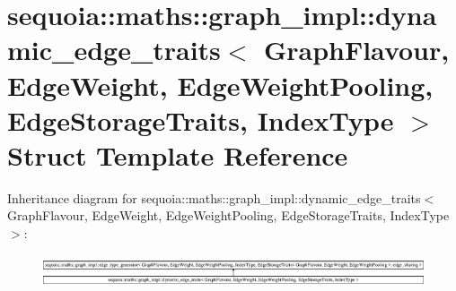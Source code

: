 \hypertarget{structsequoia_1_1maths_1_1graph__impl_1_1dynamic__edge__traits}{}\section{sequoia\+::maths\+::graph\+\_\+impl\+::dynamic\+\_\+edge\+\_\+traits$<$ Graph\+Flavour, Edge\+Weight, Edge\+Weight\+Pooling, Edge\+Storage\+Traits, Index\+Type $>$ Struct Template Reference}
\label{structsequoia_1_1maths_1_1graph__impl_1_1dynamic__edge__traits}
Inheritance diagram for sequoia\+::maths\+::graph\+\_\+impl\+::dynamic\+\_\+edge\+\_\+traits$<$ Graph\+Flavour, Edge\+Weight, Edge\+Weight\+Pooling, Edge\+Storage\+Traits, Index\+Type $>$\+:\begin{figure}[H]
\begin{center}
\leavevmode
\includegraphics[height=0.971379cm]{structsequoia_1_1maths_1_1graph__impl_1_1dynamic__edge__traits}
\end{center}
\end{figure}
